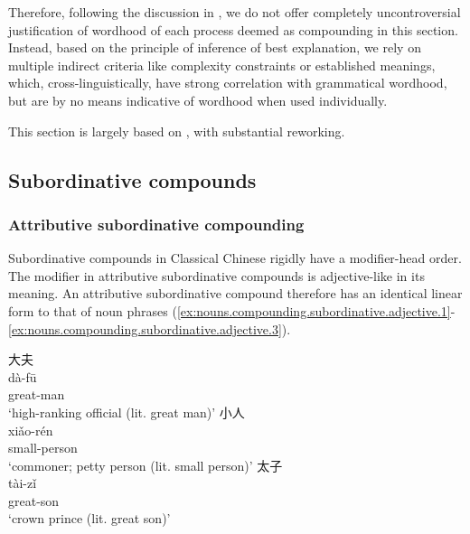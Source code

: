 \documentclass[UTF8, a4paper, oneside, scheme=plain, 12pt]{ctexrep}
\newcommand*{\citesec}[1]{\S~{#1}}
\newcommand{\translate}[1]{`#1'}
\begin{document}
Therefore, following the discussion in ,
we do not offer completely uncontroversial justification of wordhood of each process deemed as compounding in this section.
Instead, based on the principle of inference of best explanation,
we rely on multiple indirect criteria like complexity constraints or established meanings, which, cross-linguistically, have strong correlation with grammatical wordhood, but are by no means indicative of wordhood when used individually.

This section is largely based on \citet[\citesec{0.1.2}]{unger2019grammar},
with substantial reworking.

\subsection{Subordinative compounds}

\subsubsection{Attributive subordinative compounding}

Subordinative compounds in Classical Chinese rigidly have a modifier-head order.
The modifier in attributive subordinative compounds is adjective-like in its meaning.
An attributive subordinative compound therefore has an identical linear form to that of noun phrases 
(\ref{ex:nouns.compounding.subordinative.adjective.1}-\ref{ex:nouns.compounding.subordinative.adjective.3}).

\begin{exe}
    \ex\label{ex:nouns.compounding.subordinative.adjective.1}
    \glll 大夫 \\
    dà-fū \\
    great-man \\
    \glt\translate{high-ranking official (lit. great man)}
    \ex\label{ex:nouns.compounding.subordinative.adjective.2}
    \glll 小人 \\
    xiǎo-rén \\
    small-person \\
    \glt\translate{commoner; petty person (lit. small person)}
    \ex\label{ex:nouns.compounding.subordinative.adjective.3}
    \glll 太子 \\
    tài-zǐ \\
    great-son \\
    \glt\translate{crown prince (lit. great son)}
\end{exe}
\end{document}
